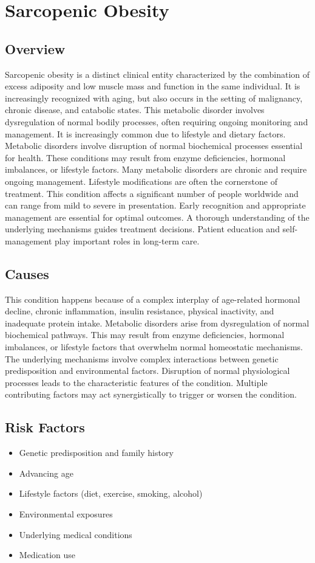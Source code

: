 \chapter{Sarcopenic Obesity}
\label{sec:Sarcopenic Obesity}

\section{Overview}
Sarcopenic obesity is a distinct clinical entity characterized by the combination of excess adiposity and low muscle mass and function in the same individual. It is increasingly recognized with aging, but also occurs in the setting of malignancy, chronic disease, and catabolic states. This metabolic disorder involves dysregulation of normal bodily processes, often requiring ongoing monitoring and management. It is increasingly common due to lifestyle and dietary factors. Metabolic disorders involve disruption of normal biochemical processes essential for health. These conditions may result from enzyme deficiencies, hormonal imbalances, or lifestyle factors. Many metabolic disorders are chronic and require ongoing management. Lifestyle modifications are often the cornerstone of treatment. This condition affects a significant number of people worldwide and can range from mild to severe in presentation. Early recognition and appropriate management are essential for optimal outcomes. A thorough understanding of the underlying mechanisms guides treatment decisions. Patient education and self-management play important roles in long-term care.
\section{Causes}
This condition happens because of a complex interplay of age-related hormonal decline, chronic inflammation, insulin resistance, physical inactivity, and inadequate protein intake. Metabolic disorders arise from dysregulation of normal biochemical pathways. This may result from enzyme deficiencies, hormonal imbalances, or lifestyle factors that overwhelm normal homeostatic mechanisms. The underlying mechanisms involve complex interactions between genetic predisposition and environmental factors. Disruption of normal physiological processes leads to the characteristic features of the condition. Multiple contributing factors may act synergistically to trigger or worsen the condition.
\section{Risk Factors}
\begin{itemize}[noitemsep]
  \item Genetic predisposition and family history
  \item Advancing age
  \item Lifestyle factors (diet, exercise, smoking, alcohol)
  \item Environmental exposures
  \item Underlying medical conditions
  \item Medication use
\end{itemize}
